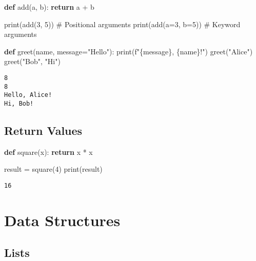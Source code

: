 \documentclass[
  letterpaper,
  DIV=11,
  numbers=noendperiod]{scrreprt}
\newenvironment{Shaded}{\begin{snugshade}}{\end{snugshade}}
\newcommand{\BuiltInTok}[1]{\textcolor[rgb]{0.00,0.23,0.31}{#1}}
\newcommand{\CommentTok}[1]{\textcolor[rgb]{0.37,0.37,0.37}{#1}}
\newcommand{\ControlFlowTok}[1]{\textcolor[rgb]{0.00,0.23,0.31}{\textbf{#1}}}
\newcommand{\DecValTok}[1]{\textcolor[rgb]{0.68,0.00,0.00}{#1}}
\newcommand{\KeywordTok}[1]{\textcolor[rgb]{0.00,0.23,0.31}{\textbf{#1}}}
\newcommand{\NormalTok}[1]{\textcolor[rgb]{0.00,0.23,0.31}{#1}}
\newcommand{\OperatorTok}[1]{\textcolor[rgb]{0.37,0.37,0.37}{#1}}
\newcommand{\SpecialCharTok}[1]{\textcolor[rgb]{0.37,0.37,0.37}{#1}}
\newcommand{\SpecialStringTok}[1]{\textcolor[rgb]{0.13,0.47,0.30}{#1}}
\newcommand{\StringTok}[1]{\textcolor[rgb]{0.13,0.47,0.30}{#1}}
\begin{document}
\begin{Shaded}
\begin{Highlighting}[]
\KeywordTok{def}\NormalTok{ add(a, b):}
    \ControlFlowTok{return}\NormalTok{ a }\OperatorTok{+}\NormalTok{ b}

\BuiltInTok{print}\NormalTok{(add(}\DecValTok{3}\NormalTok{, }\DecValTok{5}\NormalTok{))  }\CommentTok{\# Positional arguments}
\BuiltInTok{print}\NormalTok{(add(a}\OperatorTok{=}\DecValTok{3}\NormalTok{, b}\OperatorTok{=}\DecValTok{5}\NormalTok{))  }\CommentTok{\# Keyword arguments}

\KeywordTok{def}\NormalTok{ greet(name, message}\OperatorTok{=}\StringTok{"Hello"}\NormalTok{):}
    \BuiltInTok{print}\NormalTok{(}\SpecialStringTok{f"}\SpecialCharTok{\{}\NormalTok{message}\SpecialCharTok{\}}\SpecialStringTok{, }\SpecialCharTok{\{}\NormalTok{name}\SpecialCharTok{\}}\SpecialStringTok{!"}\NormalTok{)}
\NormalTok{greet(}\StringTok{"Alice"}\NormalTok{)}
\NormalTok{greet(}\StringTok{"Bob"}\NormalTok{, }\StringTok{"Hi"}\NormalTok{)}
\end{Highlighting}
\end{Shaded}

\begin{verbatim}
8
8
Hello, Alice!
Hi, Bob!
\end{verbatim}

\subsection{Return Values}\label{return-values}

\begin{Shaded}
\begin{Highlighting}[]
\KeywordTok{def}\NormalTok{ square(x):}
    \ControlFlowTok{return}\NormalTok{ x }\OperatorTok{*}\NormalTok{ x}

\NormalTok{result }\OperatorTok{=}\NormalTok{ square(}\DecValTok{4}\NormalTok{)}
\BuiltInTok{print}\NormalTok{(result)}
\end{Highlighting}
\end{Shaded}

\begin{verbatim}
16
\end{verbatim}

\section{Data Structures}\label{data-structures}

\subsection{Lists}\label{lists-1}
\end{document}
